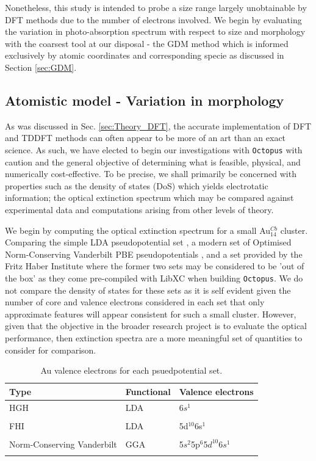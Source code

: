 Nonetheless, this study is intended to probe a size range largely unobtainable by DFT methods due to the number of electrons involved. We begin by evaluating the variation in photo-absorption spectrum with respect to size and morphology with the coarsest tool at our disposal - the GDM method which is informed exclusively by atomic coordinates and corresponding specie as discussed in Section \ref{sec:GDM}.

\subsection{Atomistic model - Variation in morphology}
\label{sec:Res_Atom}
As was discussed in Sec. \ref{sec:Theory_DFT}, the accurate implementation of DFT and TDDFT methods can often appear to be more of an art than an exact science. As such, we have elected to begin our investigations with \texttt{Octopus} \cite{Octopus2003,Octopus_2006,Oct_paralel,Oct_2015,Oct_2020} with caution and the general objective of determining what is feasible, physical, and numerically cost-effective. To be precise, we shall primarily be concerned with properties such as the density of states (DoS) which yields electrotatic information; the optical extinction spectrum which may be compared against experimental data and computations arising from other levels of theory.

We begin by computing the optical extinction spectrum for a small Au$_{14}^{Cb}$ cluster. Comparing the simple LDA pseudopotential set \cite{PhysRevB.58.3641}, a modern set of Optimised Norm-Conserving Vanderbilt PBE pseudopotentials \cite{SCHLIPF201536}, and a set provided by the Fritz Haber Institute where the former two sets may be considered to be 'out of the box' as they come pre-compiled with LibXC \cite{LibXC} when building \texttt{Octopus}. We do not compare the density of states for these sets as it is self evident given the number of core and valence electrons considered in each set that only approximate features will appear consistent for such a small cluster. However, given that the objective in the broader research project is to evaluate the optical performance, then extinction spectra are a more meaningful set of quantities to consider for comparison.

\begin{table}[ht]
\centering
\caption{Au valence electrons for each psuedpotential set.}
\label{tab:pseudos}
\begin{tabular}{@{}lll@{}}
\toprule
Type & Functional & Valence electrons  \\
\hline
HGH & LDA \cite{PhysRevB.58.3641} &  6$s^{1}$   \\ \\
FHI & LDA \cite{FHI}  &  5d$^{10}$6s$^{1}$   \\ \\
Norm-Conserving Vanderbilt & GGA \cite{SCHLIPF201536} &   5$s^{2}$5p$^{6}$5$d^{10}$6$s^{1}$    \\ \\
\bottomrule
\end{tabular}
\end{table}

